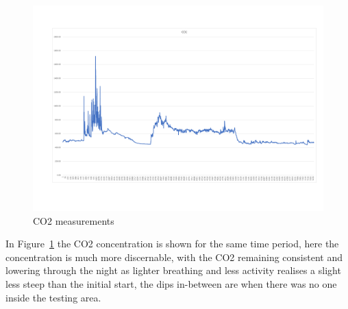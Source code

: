 \pagebreak
\begin{figure}[!htb]
	\centering
	\includegraphics[width=0.7\linewidth]{body/fig/CO2}
	\caption{CO2 measurements}
	\label{fig:co2}
\end{figure}

\noindent
In Figure~\ref{fig:co2} the CO2 concentration is shown for the same time period, here the concentration is much more discernable, with the CO2 remaining consistent and lowering through the night as lighter breathing and less activity realises a slight less steep than the initial start, the dips in-between are when there was no one inside the testing area.



